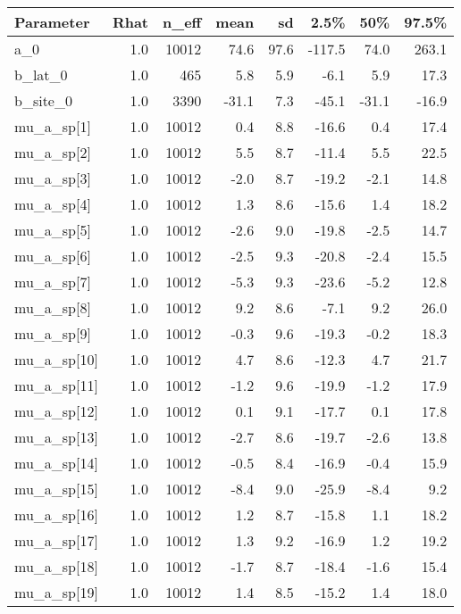 \documentclass{article}
\begin{document}
\begin{table}[ht]
\centering
\begin{tabular}{lrrrrrrr}
  \toprule
Parameter & Rhat & n\_eff & mean & sd & 2.5\% & 50\% & 97.5\% \\ 
  \midrule
a\_0 & 1.0 & 10012 & 74.6 & 97.6 & -117.5 & 74.0 & 263.1 \\ 
  b\_lat\_0 & 1.0 & 465 & 5.8 & 5.9 & -6.1 & 5.9 & 17.3 \\ 
  b\_site\_0 & 1.0 & 3390 & -31.1 & 7.3 & -45.1 & -31.1 & -16.9 \\ 
  mu\_a\_sp[1] & 1.0 & 10012 & 0.4 & 8.8 & -16.6 & 0.4 & 17.4 \\ 
  mu\_a\_sp[2] & 1.0 & 10012 & 5.5 & 8.7 & -11.4 & 5.5 & 22.5 \\ 
  mu\_a\_sp[3] & 1.0 & 10012 & -2.0 & 8.7 & -19.2 & -2.1 & 14.8 \\ 
  mu\_a\_sp[4] & 1.0 & 10012 & 1.3 & 8.6 & -15.6 & 1.4 & 18.2 \\ 
  mu\_a\_sp[5] & 1.0 & 10012 & -2.6 & 9.0 & -19.8 & -2.5 & 14.7 \\ 
  mu\_a\_sp[6] & 1.0 & 10012 & -2.5 & 9.3 & -20.8 & -2.4 & 15.5 \\ 
  mu\_a\_sp[7] & 1.0 & 10012 & -5.3 & 9.3 & -23.6 & -5.2 & 12.8 \\ 
  mu\_a\_sp[8] & 1.0 & 10012 & 9.2 & 8.6 & -7.1 & 9.2 & 26.0 \\ 
  mu\_a\_sp[9] & 1.0 & 10012 & -0.3 & 9.6 & -19.3 & -0.2 & 18.3 \\ 
  mu\_a\_sp[10] & 1.0 & 10012 & 4.7 & 8.6 & -12.3 & 4.7 & 21.7 \\ 
  mu\_a\_sp[11] & 1.0 & 10012 & -1.2 & 9.6 & -19.9 & -1.2 & 17.9 \\ 
  mu\_a\_sp[12] & 1.0 & 10012 & 0.1 & 9.1 & -17.7 & 0.1 & 17.8 \\ 
  mu\_a\_sp[13] & 1.0 & 10012 & -2.7 & 8.6 & -19.7 & -2.6 & 13.8 \\ 
  mu\_a\_sp[14] & 1.0 & 10012 & -0.5 & 8.4 & -16.9 & -0.4 & 15.9 \\ 
  mu\_a\_sp[15] & 1.0 & 10012 & -8.4 & 9.0 & -25.9 & -8.4 & 9.2 \\ 
  mu\_a\_sp[16] & 1.0 & 10012 & 1.2 & 8.7 & -15.8 & 1.1 & 18.2 \\ 
  mu\_a\_sp[17] & 1.0 & 10012 & 1.3 & 9.2 & -16.9 & 1.2 & 19.2 \\ 
  mu\_a\_sp[18] & 1.0 & 10012 & -1.7 & 8.7 & -18.4 & -1.6 & 15.4 \\ 
  mu\_a\_sp[19] & 1.0 & 10012 & 1.4 & 8.5 & -15.2 & 1.4 & 18.0 \\ 

\end{tabular}
\end{table}
\end{document}
